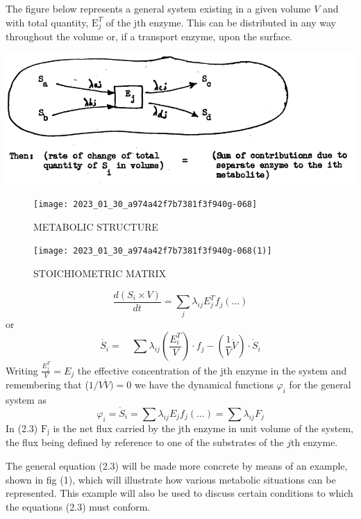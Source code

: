 The figure below represents a general system existing in a given volume $V$ and with total quantity, $\mathrm{E}_j^T$ of the jth enzyme. This can be distributed in any way throughout the volume or, if a transport enzyme, upon the surface.

\centerline{\includegraphics[scale=0.8]{figure2_1.png}}


\begin{figure}
\texttt{[image: 2023\_01\_30\_a974a42f7b7381f3f940g-068]}
\caption{METABOLIC STRUCTURE}
\end{figure}

\begin{figure}
\texttt{[image: 2023\_01\_30\_a974a42f7b7381f3f940g-068(1)]}
\caption{STOICHIOMETRIC MATRIX}
\end{figure}

\begin{equation}
\frac{d (S_i \times V)}{dt} = \sum_j \lambda_{ij} E_{j}^{T} f_{j}(\ldots)
\label{eqn:22}
\end{equation}
%
or
%
$$
\dot{S_i} =\quad \sum \lambda_{i j}\left(\frac{E_{i}^T}{V}\right) \cdot f_{j} - \left(\frac{1}{V} \dot{V}\right) \cdot \dot{S}_{i}
$$
%
Writing $\frac{E_{j}^{T}}{V}=E_{j}$ the effective concentration of the jth enzyme in the system and remembering that  ($1/V \dot{V})=0$ we have the dynamical functions $\varphi_{i}$ for the general system as
%
\begin{equation}
\varphi_{i}=\dot{S}_{i}= \sum \lambda_{i j} E_{j} f_{j}(\ldots)= \sum \lambda_{ij} F_{j}
\label{eqn:23}
\end{equation}
%
In (2.3) $\mathrm{F}_{\mathrm{j}}$ is the net flux carried by the $\mathrm{jth}$ enzyme in unit volume of the system, the flux being defined by reference to one of the substrates of the $j$th enzyme.

The general equation (2.3) will be made more concrete by means of an example, shown in fig (1), which will illustrate how various metabolic situations can be represented. This example will also be used to discuss certain conditions to which the equations (2.3) must conform.

